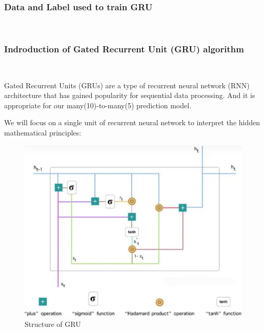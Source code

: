 \subsubsection{Data and Label used to train GRU}~{}



\subsubsection{Indroduction of Gated Recurrent Unit (GRU) algorithm}~{}

Gated Recurrent Units (GRUs) are a type of recurrent neural network (RNN) 
architecture that has gained popularity for sequential data processing. 
And it is appropriate for our many(10)-to-many(5) prediction model.

We will focus on a single unit of recurrent neural network to interpret the hidden mathematical principles:
\begin{figure}[H]
    \centering
    \includegraphics[scale=0.15]{mainmatter/imgs/6.jpg}
    \caption{Structure of GRU}
\end{figure}

